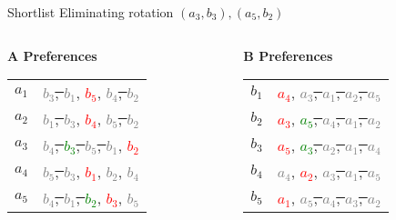 \documentclass[aspectratio=169,xcolor=dvipsnames]{beamer}
\begin{document}
\begin{frame}{Shortlist}
Eliminating rotation \( (a_3,b_3), (a_5,b_2) \)

\vspace{1em}
\begin{columns}[t]
  \begin{column}{0.45\textwidth}
    \textbf{A Preferences}\\[6pt]
    \begin{tabular}{r@{: }l}
      $a_1$ & \sout{\textcolor{gray}{$b_3$}, \textcolor{gray}{$b_1$}}, \textcolor{red}{$b_5$}, \sout{\textcolor{gray}{$b_4$}, \textcolor{gray}{$b_2$}} \\
      $a_2$ & \sout{\textcolor{gray}{$b_1$}, \textcolor{gray}{$b_3$}}, \textcolor{red}{$b_4$}, \sout{\textcolor{gray}{$b_5$}, \textcolor{gray}{$b_2$}} \\
      $a_3$ & \sout{\textcolor{gray}{$b_4$}, \textcolor{green}{$b_3$}, \textcolor{gray}{$b_5$}, \textcolor{gray}{$b_1$}}, \textcolor{red}{$b_2$} \\
      $a_4$ & \sout{\textcolor{gray}{$b_5$}, \textcolor{gray}{$b_3$}}, \textcolor{red}{$b_1$}, \sout{\textcolor{gray}{$b_2$}}, \textcolor{gray}{$b_4$} \\
      $a_5$ & \sout{\textcolor{gray}{$b_4$}, \textcolor{gray}{$b_1$}, \textcolor{green}{$b_2$}}, \textcolor{red}{$b_3$}, \sout{\textcolor{gray}{$b_5$}} \\
    \end{tabular}
  \end{column}

  \begin{column}{0.45\textwidth}
    \textbf{B Preferences}\\[6pt]
    \begin{tabular}{r@{: }l}
      $b_1$ & \textcolor{red}{$a_4$}, \sout{\textcolor{gray}{$a_3$}, \textcolor{gray}{$a_1$}, \textcolor{gray}{$a_2$}, \textcolor{gray}{$a_5$}} \\
      $b_2$ & \textcolor{red}{$a_3$}, \sout{\textcolor{green}{$a_5$}, \textcolor{gray}{$a_4$}, \textcolor{gray}{$a_1$}, \textcolor{gray}{$a_2$}} \\
      $b_3$ & \textcolor{red}{$a_5$}, \sout{\textcolor{green}{$a_3$}, \textcolor{gray}{$a_2$}, \textcolor{gray}{$a_1$}, \textcolor{gray}{$a_4$}} \\
      $b_4$ & \textcolor{gray}{$a_4$}, \textcolor{red}{$a_2$}, \sout{\textcolor{gray}{$a_3$}, \textcolor{gray}{$a_1$}, \textcolor{gray}{$a_5$}} \\
      $b_5$ & \textcolor{red}{$a_1$}, \sout{\textcolor{gray}{$a_5$}, \textcolor{gray}{$a_4$}, \textcolor{gray}{$a_3$}, \textcolor{gray}{$a_2$}} \\
    \end{tabular}
  \end{column}
\end{columns}



\end{frame}
\end{document}
